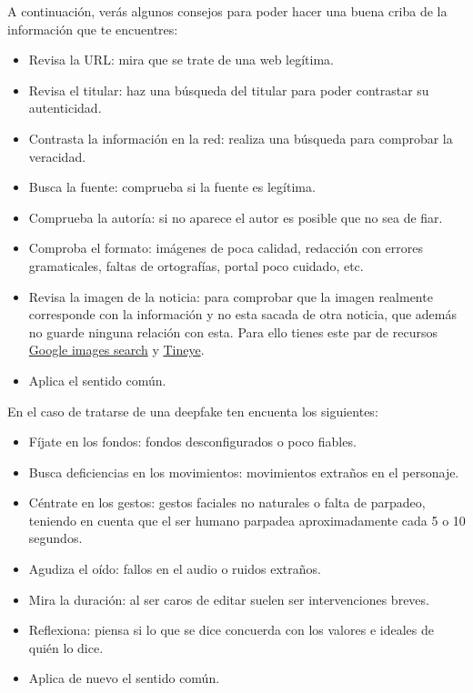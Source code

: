 \documentclass[
  a4paper,
  openany]{book}
\begin{document}
A continuación, verás algunos consejos para poder hacer una buena criba de la información que te encuentres:

\begin{itemize}
\item
  Revisa la URL: mira que se trate de una web legítima.
\item
  Revisa el titular: haz una búsqueda del titular para poder contrastar su autenticidad.
\item
  Contrasta la información en la red: realiza una búsqueda para comprobar la veracidad.
\item
  Busca la fuente: comprueba si la fuente es legítima.
\item
  Comprueba la autoría: si no aparece el autor es posible que no sea de fiar.
\item
  Comproba el formato: imágenes de poca calidad, redacción con errores gramaticales, faltas de ortografías, portal poco cuidado, etc.
\item
  Revisa la imagen de la noticia: para comprobar que la imagen realmente corresponde con la información y no esta sacada de otra noticia, que además no guarde ninguna relación con esta. Para ello tienes este par de recursos \href{https://www.google.es/imghp?hl=es}{Google images search} y \href{https://tineye.com/}{Tineye}.
\item
  Aplica el sentido común.
\end{itemize}

En el caso de tratarse de una deepfake ten encuenta los siguientes:

\begin{itemize}
\item
  Fíjate en los fondos: fondos desconfigurados o poco fiables.
\item
  Busca deficiencias en los movimientos: movimientos extraños en el personaje.
\item
  Céntrate en los gestos: gestos faciales no naturales o falta de parpadeo, teniendo en cuenta que el ser humano parpadea aproximadamente cada 5 o 10 segundos.
\item
  Agudiza el oído: fallos en el audio o ruidos extraños.
\item
  Mira la duración: al ser caros de editar suelen ser intervenciones breves.
\item
  Reflexiona: piensa si lo que se dice concuerda con los valores e ideales de quién lo dice.
\item
  Aplica de nuevo el sentido común.
\end{itemize}
\end{document}
